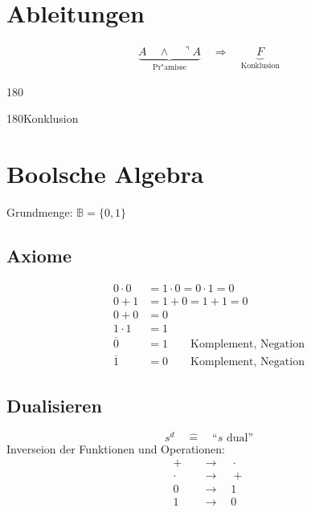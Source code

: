 \section{Ableitungen}
\begin{gather}
	\underbrace{A\quad\wedge\quad\urcorner A}_\text{Pr"amisse}\quad\Longrightarrow\quad\underbrace{F}_\text{Konklusion}
\end{gather}
\vspace{5mm}
\begin{center}
	\begin{rotate}{180}
		\setlength{\GapWidth}{2cm}
		\setlength{\GapDepth}{1cm}
		\begin{bundle}{\begin{rotate}{180}Konklusion\end{rotate}}
		\end{bundle}
	\end{rotate}
\end{center}
\vspace{5mm}

\section{Boolsche Algebra}
Grundmenge: $\mathbb{B}=\{0,1\}$
\subsection{Axiome}
\begin{align}
	0\cdot 0 &= 1\cdot 0=0\cdot 1=0 \\
	0+1 &= 1+0 = 1+1 = 0 \\
	0+0 &= 0 \\
	1\cdot 1 &= 1 \\
	\overline{0} &= 1\qquad\text{Komplement, Negation} \\
	\overline{1} &= 0\qquad\text{Komplement, Negation}
\end{align}

\subsection{Dualisieren}
\begin{equation*}
	s^d\quad\hat{=}\quad\text{``$s$ dual''}
\end{equation*}
Inverseion der Funktionen und Operationen:
\begin{align*}
	+\quad & \rightarrow\quad\cdot \\
	\cdot\quad & \rightarrow\quad + \\
	0 \quad & \rightarrow\quad 1 \\
	1 \quad & \rightarrow\quad 0
\end{align*}

